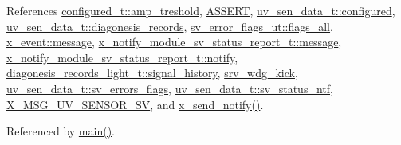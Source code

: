 References \hyperlink{a00021_a4b3bbfb0267daea1432f2603825ade62}{configured\+\_\+t\+::amp\+\_\+treshold}, \hyperlink{a00072_source_l00059}{A\+S\+S\+E\+R\+T}, \hyperlink{a00035_source_l00044}{uv\+\_\+sen\+\_\+data\+\_\+t\+::configured}, \hyperlink{a00035_source_l00056}{uv\+\_\+sen\+\_\+data\+\_\+t\+::diagonesis\+\_\+records}, \hyperlink{a00022_source_l00044}{sv\+\_\+error\+\_\+flags\+\_\+ut\+::flags\+\_\+all}, \hyperlink{a00036_source_l00064}{x\+\_\+event\+::message}, \hyperlink{a00021_a13393a2d1589483b3bae4d2e79f43980}{x\+\_\+notify\+\_\+module\+\_\+sv\+\_\+status\+\_\+report\+\_\+t\+::message}, \hyperlink{a00021_source_l00223}{x\+\_\+notify\+\_\+module\+\_\+sv\+\_\+status\+\_\+report\+\_\+t\+::notify}, \hyperlink{a00017_affb63906d23cb1cb7787d61eaaedfb60}{diagonesis\+\_\+records\+\_\+light\+\_\+t\+::signal\+\_\+history}, \hyperlink{a00067_source_l00028}{srv\+\_\+wdg\+\_\+kick}, \hyperlink{a00035_source_l00059}{uv\+\_\+sen\+\_\+data\+\_\+t\+::sv\+\_\+errors\+\_\+flags}, \hyperlink{a00035_source_l00034}{uv\+\_\+sen\+\_\+data\+\_\+t\+::sv\+\_\+status\+\_\+ntf}, \hyperlink{a00035_source_l00013}{X\+\_\+\+M\+S\+G\+\_\+\+U\+V\+\_\+\+S\+E\+N\+S\+O\+R\+\_\+\+S\+V}, and \hyperlink{a00037_source_l00435}{x\+\_\+send\+\_\+notify()}.



Referenced by \hyperlink{a00048_source_l00080}{main()}.


